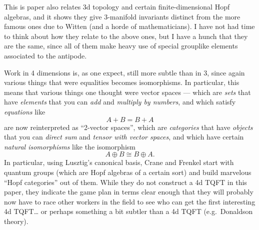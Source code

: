 \documentclass{article}
\def\tightlist{}
\renewcommand{\texttt}[1]{%
  \begingroup
  \ttfamily
  \begingroup\lccode`~=`/\lowercase{\endgroup\def~}{/\discretionary{}{}{}}%
  \begingroup\lccode`~=`[\lowercase{\endgroup\def~}{[\discretionary{}{}{}}%
  \begingroup\lccode`~=`.\lowercase{\endgroup\def~}{.\discretionary{}{}{}}%
  \catcode`/=\active\catcode`[=\active\catcode`.=\active
  \scantokens{#1\noexpand}%
  \endgroup
}
\begin{document}

This is paper also relates 3d topology and certain finite-dimensional
Hopf algebras, and it shows they give 3-manifold invariants distinct
from the more famous ones due to Witten (and a horde of mathematicians).
I have not had time to think about how they relate to the above ones,
but I have a hunch that they are the same, since all of them make heavy
use of special grouplike elements associated to the antipode.


Work in 4 dimensions is, as one expect, still more subtle than in 3,
since again various things that were equalities becomes isomorphisms. In
particular, this means that various things one thought were vector
spaces --- which are \emph{sets} that have \emph{elements} that you can
\emph{add} and \emph{multiply by numbers}, and which satisfy
\emph{equations} like \[A + B = B + A\] are now reinterpreted as
``2-vector spaces'', which are \emph{categories} that have
\emph{objects} that you can \emph{direct sum} and \emph{tensor with
vector spaces}, and which have certain \emph{natural isomorphisms} like
the isomorphism \[A \oplus B \cong B \oplus A.\] In particular, using
Lusztig's canonical basis, Crane and Frenkel start with quantum groups
(which are Hopf algebras of a certain sort) and build marvelous ``Hopf
categories'' out of them. While they do not construct a 4d TQFT in this
paper, they indicate the game plan in terms clear enough that they will
probably now have to race other workers in the field to see who can get
the first interesting 4d TQFT\ldots{} or perhaps something a bit subtler
than a 4d TQFT (e.g.~Donaldson theory).
\end{document}
